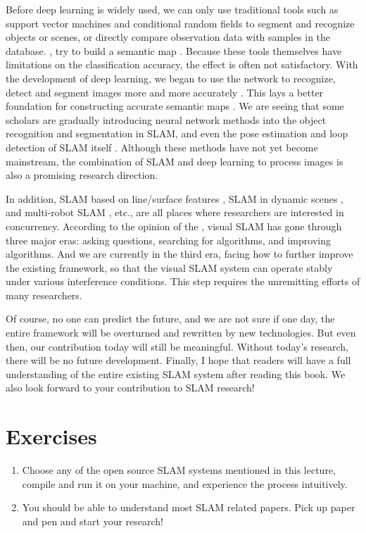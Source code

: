 Before deep learning is widely used, we can only use traditional tools such as support vector machines and conditional random fields to segment and recognize objects or scenes, or directly compare observation data with samples in the database. {\cite{Salas- Moreno2013, Salas-Moreno2014}}, try to build a semantic map {\cite{Anand2012, Stueckler2012, Kostavelis2013, Couprie2013}}. Because these tools themselves have limitations on the classification accuracy, the effect is often not satisfactory. With the development of deep learning, we began to use the network to recognize, detect and segment images more and more accurately {\cite{Deng2009, Krizhevsky2012, He2015, Ren2015, Long2014, Zheng2015}}. This lays a better foundation for constructing accurate semantic maps {\cite{Gupta2014}}. We are seeing that some scholars are gradually introducing neural network methods into the object recognition and segmentation in SLAM, and even the pose estimation and loop detection of SLAM itself {\cite{Konda2015, Kendall2015, Hou2015}}. Although these methods have not yet become mainstream, the combination of SLAM and deep learning to process images is also a promising research direction.

In addition, SLAM based on line/surface features  {\cite{An2012, Zhou2015, Benedettelli2012}} , SLAM in dynamic scenes {\cite{Saarinen2013, Maddern2012, Wang2008}}, and multi-robot SLAM {\cite{Zou2013, Gil2010a, Vidal-Calleja2011}}, etc., are all places where researchers are interested in concurrency. According to the opinion of the \cite{Cadena2016}, visual SLAM has gone through three major eras: asking questions, searching for algorithms, and improving algorithms. And we are currently in the third era, facing how to further improve the existing framework, so that the visual SLAM system can operate stably under various interference conditions. This step requires the unremitting efforts of many researchers.

Of course, no one can predict the future, and we are not sure if one day, the entire framework will be overturned and rewritten by new technologies. But even then, our contribution today will still be meaningful. Without today's research, there will be no future development. Finally, I hope that readers will have a full understanding of the entire existing SLAM system after reading this book. We also look forward to your contribution to SLAM research!

\section*{Exercises}
\begin{enumerate}
	\item Choose any of the open source SLAM systems mentioned in this lecture, compile and run it on your machine, and experience the process intuitively.
	\item You should be able to understand most SLAM related papers. Pick up paper and pen and start your research!
\end{enumerate}

